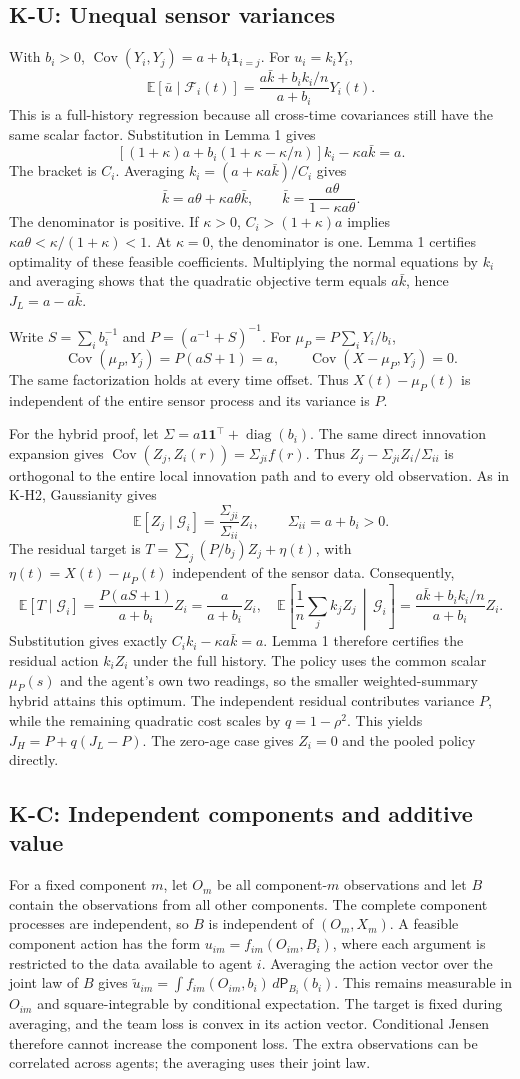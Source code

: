 \documentclass[11pt,letterpaper]{article}
\newcommand{\E}{\mathbb E}
\newcommand{\Cov}{\operatorname{Cov}}
\newcommand{\one}{\mathbf1}
\newcommand{\G}{\mathcal G}
\newcommand{\F}{\mathcal F}
\newcommand{\calculation}[2]{\subsection{#1: #2}}
\begin{document}
\calculation{K-U}{Unequal sensor variances}
With $b_i>0$, $\Cov(Y_i,Y_j)=a+b_i\mathbf1_{i=j}$. For $u_i=k_iY_i$,
\[
\E[\bar u\mid\F_i(t)]
=\frac{a\bar k+b_i k_i/n}{a+b_i}Y_i(t).
\]
This is a full-history regression because all cross-time covariances still have the same scalar factor. Substitution in Lemma 1 gives
\[
\left[(1+\kappa)a+b_i(1+\kappa-\kappa/n)\right]k_i
-\kappa a\bar k=a.
\]
The bracket is $C_i$. Averaging $k_i=(a+\kappa a\bar k)/C_i$ gives
\[
\bar k=a\theta+\kappa a\theta\bar k,
\qquad \bar k=\frac{a\theta}{1-\kappa a\theta}.
\]
The denominator is positive. If $\kappa>0$, $C_i>(1+\kappa)a$ implies $\kappa a\theta<\kappa/(1+\kappa)<1$. At $\kappa=0$, the denominator is one. Lemma 1 certifies optimality of these feasible coefficients. Multiplying the normal equations by $k_i$ and averaging shows that the quadratic objective term equals $a\bar k$, hence $J_L=a-a\bar k$.

Write $S=\sum_i b_i^{-1}$ and $P=(a^{-1}+S)^{-1}$. For $\mu_P=P\sum_iY_i/b_i$,
\[
\Cov(\mu_P,Y_j)=P(aS+1)=a,
\qquad
\Cov(X-\mu_P,Y_j)=0.
\]
The same factorization holds at every time offset. Thus $X(t)-\mu_P(t)$ is independent of the entire sensor process and its variance is $P$.

For the hybrid proof, let $\Sigma=a\one\one^\top+\operatorname{diag}(b_i)$. The same direct innovation expansion gives $\Cov(Z_j,Z_i(r))=\Sigma_{ji}f(r)$. Thus $Z_j-\Sigma_{ji}Z_i/\Sigma_{ii}$ is orthogonal to the entire local innovation path and to every old observation. As in K-H2, Gaussianity gives
\[
\E[Z_j\mid\G_i]=\frac{\Sigma_{ji}}{\Sigma_{ii}}Z_i,
\qquad \Sigma_{ii}=a+b_i>0.
\]
The residual target is $T=\sum_j(P/b_j)Z_j+\eta(t)$, with $\eta(t)=X(t)-\mu_P(t)$ independent of the sensor data. Consequently,
\[
\E[T\mid\G_i]=\frac{P(aS+1)}{a+b_i}Z_i=\frac{a}{a+b_i}Z_i,
\quad
\E\left[\frac1n\sum_j k_jZ_j\,\middle|\,\G_i\right]
=\frac{a\bar k+b_i k_i/n}{a+b_i}Z_i.
\]
Substitution gives exactly $C_i k_i-\kappa a\bar k=a$. Lemma 1 therefore certifies the residual action $k_iZ_i$ under the full history. The policy uses the common scalar $\mu_P(s)$ and the agent's own two readings, so the smaller weighted-summary hybrid attains this optimum. The independent residual contributes variance $P$, while the remaining quadratic cost scales by $q=1-\rho^2$. This yields $J_H=P+q(J_L-P)$. The zero-age case gives $Z_i=0$ and the pooled policy directly.

\calculation{K-C}{Independent components and additive value}
For a fixed component $m$, let $O_m$ be all component-$m$ observations and let $B$ contain the observations from all other components. The complete component processes are independent, so $B$ is independent of $(O_m,X_m)$. A feasible component action has the form $u_{im}=f_{im}(O_{im},B_i)$, where each argument is restricted to the data available to agent $i$. Averaging the action vector over the joint law of $B$ gives $\widetilde u_{im}=\int f_{im}(O_{im},b_i)\,d\mathsf P_{B_i}(b_i)$. This remains measurable in $O_{im}$ and square-integrable by conditional expectation. The target is fixed during averaging, and the team loss is convex in its action vector. Conditional Jensen therefore cannot increase the component loss. The extra observations can be correlated across agents; the averaging uses their joint law.
\end{document}
